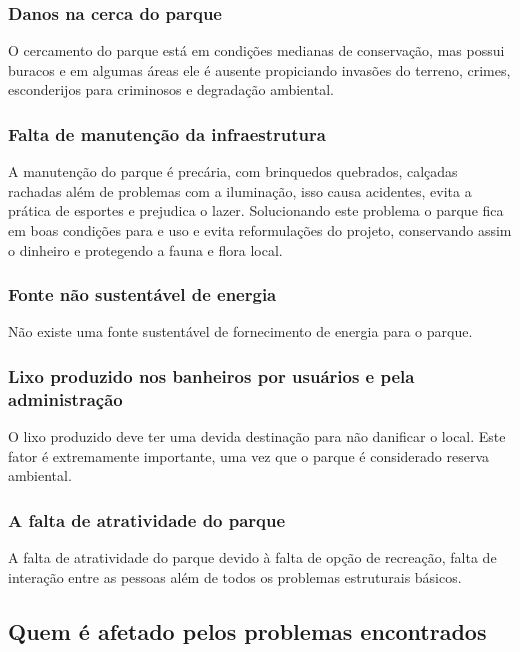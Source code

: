 \subsubsection{Danos na cerca do parque}

O cercamento do parque est\'a em condi\c{c}\~oes medianas de conserva\c{c}\~ao, mas possui buracos e em algumas \'areas ele \'e ausente propiciando invas\~oes do terreno, crimes, esconderijos para criminosos e degrada\c{c}\~ao ambiental.

\subsubsection{Falta de manuten\c{c}\~ao da infraestrutura}

A manuten\c{c}\~ao do parque \'e prec\'aria, com brinquedos quebrados, cal\c{c}adas rachadas al\'em de problemas com a ilumina\c{c}\~ao, isso causa acidentes, evita a pr\'atica de esportes e prejudica o lazer. Solucionando este problema o parque fica em boas condi\c{c}\~oes para e uso e evita reformula\c{c}\~oes do projeto, conservando assim o dinheiro e protegendo a fauna e flora local. 

\subsubsection{Fonte n\~ao sustent\'avel de energia}

N\~ao existe uma fonte sustent\'avel de fornecimento de energia para o parque.

\subsubsection{Lixo produzido nos banheiros por usu\'arios e pela administra\c{c}\~ao}

O lixo produzido deve ter uma devida destina\c{c}\~ao para n\~ao danificar o local. Este fator \'e extremamente importante, uma vez que o parque \'e considerado reserva ambiental.

\subsubsection{A falta de atratividade do parque}

A falta de atratividade do parque devido \`a falta de op\c{c}\~ao de recrea\c{c}\~ao, falta de intera\c{c}\~ao entre as pessoas al\'em de todos os problemas estruturais b\'asicos.

\subsection{Quem \'e afetado pelos problemas encontrados}


